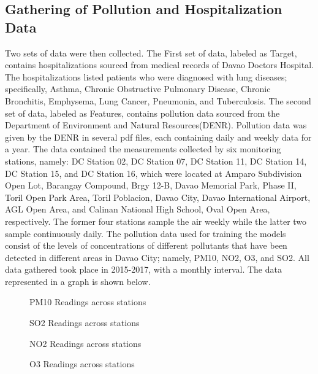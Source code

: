 \documentclass[10pt,11pt,12pt,oneside]{book}
\begin{document}
    \subsection{Gathering of Pollution and Hospitalization Data}
    Two sets of data were then collected. The First set of data, labeled as Target, contains hospitalizations sourced from medical records of Davao Doctors Hospital. The hospitalizations listed patients who were diagnosed with lung diseases; specifically, Asthma, Chronic Obstructive Pulmonary Disease, Chronic Bronchitis, Emphysema, Lung Cancer, Pneumonia, and Tuberculosis. The second set of data, labeled as Features, contains pollution data sourced from the Department of Environment and Natural
    Resources(DENR). Pollution data was given by the DENR in several pdf files, each containing daily and weekly data for a year. The data contained the measurements collected by six monitoring stations, namely: DC Station 02, DC Station 07, DC Station 11, DC Station 14, DC Station 15, and DC Station 16, which were located at Amparo Subdivision Open Lot, Barangay Compound, Brgy 12-B, Davao Memorial Park, Phase II, Toril Open Park Area, Toril Poblacion, Davao City, Davao International Airport, AGL Open
Area, and Calinan National High School, Oval Open Area, respectively. The former four stations sample the air weekly while the latter two sample continuously daily. The pollution data used for training the models consist of the levels of concentrations of different pollutants that have been detected in different areas in Davao City; namely, PM10, NO2, O3, and SO2. All data gathered took place in 2015-2017, with a monthly interval. The data represented in a graph is shown below.\\
\begin{figure}[H]
\centering
\resizebox{!}{10cm}{}
\caption{PM10 Readings across stations}
\label{fig:pm10graph}
\end{figure}
\begin{figure}[H]
\centering
\resizebox{!}{10cm}{}
\caption{SO2 Readings across stations}
\label{fig:so2graph}
\end{figure}
\begin{figure}[H]
\centering
\resizebox{!}{10cm}{}
\caption{NO2 Readings across stations}
\label{fig:no2graph}
\end{figure}
\begin{figure}[H]
\centering
\resizebox{!}{10cm}{}
\caption{O3 Readings across stations}
\label{fig:o3graph}
\end{figure}
\pagebreak
\end{document}
